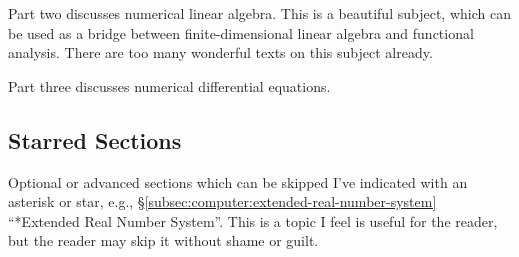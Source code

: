 \bigbreak
Part two discusses numerical linear algebra. This is a beautiful
subject, which can be used as a bridge between finite-dimensional linear
algebra and functional analysis. There are too many wonderful texts on
this subject already.

\bigbreak
Part three discusses numerical differential equations.

\subsection*{Starred Sections}

Optional or advanced sections which can be skipped I've indicated with
an asterisk or star, e.g.,
\S\ref{subsec:computer:extended-real-number-system} ``*Extended Real
Number System''. This is a topic I feel is useful for the reader, but
the reader may skip it without shame or guilt.
